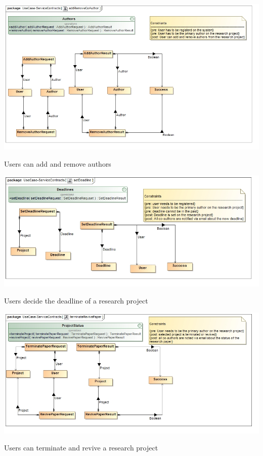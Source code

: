 \documentclass[a4paper,12pt]{report}
\begin{document}
\begin{flushleft}
	\includegraphics[scale=0.5]{./images/class__addRemoveCoAuthor.jpg}
	\begin{center}
		Users can add and remove authors
	\end{center}
\end{flushleft}

\newpage

\begin{flushleft}
	\includegraphics[scale=0.5]{./images/class__setDeadline.jpg}
	\begin{center}
		Users decide the deadline of a research project
	\end{center}
\end{flushleft}

\begin{flushleft}
	\includegraphics[scale=0.5]{./images/class__terminateRevivePaper.jpg}
	\begin{center}
		Users can terminate and revive a research project
	\end{center}
\end{flushleft}
\end{document}
